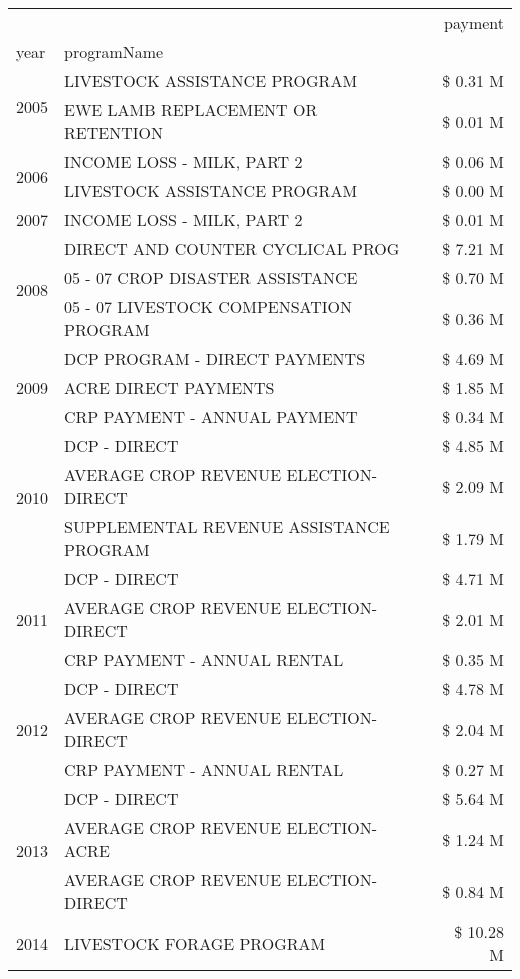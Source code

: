 \begin{tabular}{llr}
\toprule
 &  & payment \\
year & programName &  \\
\midrule
\multirow[t]{2}{*}{2005} & LIVESTOCK ASSISTANCE PROGRAM & \$ 0.31 M \\
 & EWE LAMB REPLACEMENT OR RETENTION & \$ 0.01 M \\
\cline{1-3}
\multirow[t]{2}{*}{2006} & INCOME LOSS - MILK, PART 2 & \$ 0.06 M \\
 & LIVESTOCK ASSISTANCE PROGRAM & \$ 0.00 M \\
\cline{1-3}
2007 & INCOME LOSS - MILK, PART 2 & \$ 0.01 M \\
\cline{1-3}
\multirow[t]{3}{*}{2008} & DIRECT AND COUNTER CYCLICAL PROG & \$ 7.21 M \\
 & 05 - 07 CROP DISASTER ASSISTANCE & \$ 0.70 M \\
 & 05 - 07 LIVESTOCK COMPENSATION PROGRAM & \$ 0.36 M \\
\cline{1-3}
\multirow[t]{3}{*}{2009} & DCP PROGRAM - DIRECT PAYMENTS & \$ 4.69 M \\
 & ACRE DIRECT PAYMENTS & \$ 1.85 M \\
 & CRP PAYMENT - ANNUAL PAYMENT & \$ 0.34 M \\
\cline{1-3}
\multirow[t]{3}{*}{2010} & DCP - DIRECT & \$ 4.85 M \\
 & AVERAGE CROP REVENUE ELECTION-DIRECT & \$ 2.09 M \\
 & SUPPLEMENTAL REVENUE ASSISTANCE PROGRAM & \$ 1.79 M \\
\cline{1-3}
\multirow[t]{3}{*}{2011} & DCP - DIRECT & \$ 4.71 M \\
 & AVERAGE CROP REVENUE ELECTION-DIRECT & \$ 2.01 M \\
 & CRP PAYMENT - ANNUAL RENTAL & \$ 0.35 M \\
\cline{1-3}
\multirow[t]{3}{*}{2012} & DCP - DIRECT & \$ 4.78 M \\
 & AVERAGE CROP REVENUE ELECTION-DIRECT & \$ 2.04 M \\
 & CRP PAYMENT - ANNUAL RENTAL & \$ 0.27 M \\
\cline{1-3}
\multirow[t]{3}{*}{2013} & DCP - DIRECT & \$ 5.64 M \\
 & AVERAGE CROP REVENUE ELECTION-ACRE & \$ 1.24 M \\
 & AVERAGE CROP REVENUE ELECTION-DIRECT & \$ 0.84 M \\
\cline{1-3}
\multirow[t]{3}{*}{2014} & LIVESTOCK FORAGE PROGRAM & \$ 10.28 M \\

\end{tabular}
